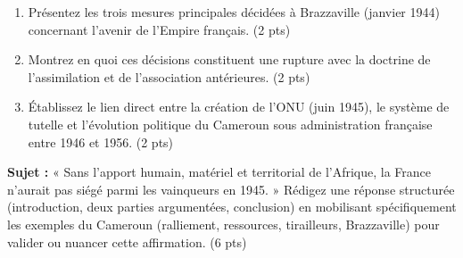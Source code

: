 \documentclass[11pt]{article}
\begin{document}
\begin{exercice}
\begin{enumerate}
    \item Présentez les trois mesures principales décidées à Brazzaville (janvier 1944) concernant l'avenir de l'Empire français. (2 pts)
    \item Montrez en quoi ces décisions constituent une rupture avec la doctrine de l'assimilation et de l'association antérieures. (2 pts)
    \item Établissez le lien direct entre la création de l'ONU (juin 1945), le système de tutelle et l'évolution politique du Cameroun sous administration française entre 1946 et 1956. (2 pts)
\end{enumerate}
\end{exercice}

\begin{exercice}
\textbf{Sujet :} « Sans l'apport humain, matériel et territorial de l'Afrique, la France n'aurait pas siégé parmi les vainqueurs en 1945. »
Rédigez une réponse structurée (introduction, deux parties argumentées, conclusion) en mobilisant spécifiquement les exemples du Cameroun (ralliement, ressources, tirailleurs, Brazzaville) pour valider ou nuancer cette affirmation. (6 pts)
\end{exercice}
\end{document}

